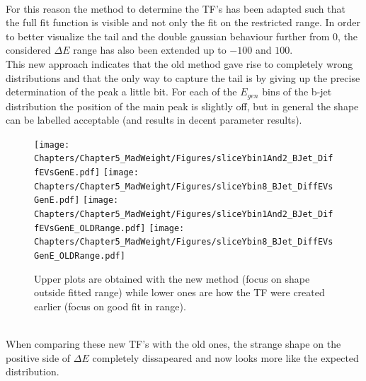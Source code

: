 \hfill \\
For this reason the method to determine the TF's has been adapted such that the full fit function is visible and not only the fit on the restricted range. In order to better visualize the tail and the double gaussian behaviour further from 0, the considered $\Delta E$ range has also been extended up to $-100$ and $100$. 
\\
This new approach indicates that the old method gave rise to completely wrong distributions and that the only way to capture the tail is by giving up the precise determination of the peak a little bit. For each of the $E_{gen}$ bins of the b-jet distribution the position of the main peak is slightly off, but in general the shape can be labelled acceptable (and results in decent parameter results).
\begin{figure}[h!t]
 \centering
 \texttt{[image: Chapters/Chapter5\_MadWeight/Figures/sliceYbin1And2\_BJet\_DiffEVsGenE.pdf]}
 \texttt{[image: Chapters/Chapter5\_MadWeight/Figures/sliceYbin8\_BJet\_DiffEVsGenE.pdf]}
 \texttt{[image: Chapters/Chapter5\_MadWeight/Figures/sliceYbin1And2\_BJet\_DiffEVsGenE\_OLDRange.pdf]}
 \texttt{[image: Chapters/Chapter5\_MadWeight/Figures/sliceYbin8\_BJet\_DiffEVsGenE\_OLDRange.pdf]}
 \caption{Upper plots are obtained with the new method (focus on shape outside fitted range) while lower ones are how the TF were created earlier (focus on good fit in range).}
\end{figure}
\hfill \\
When comparing these new TF's with the old ones, the strange shape on the positive side of $\Delta E$ completely dissapeared and now looks more like the expected distribution.
